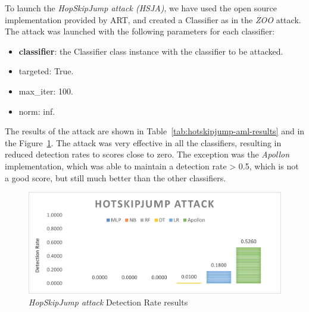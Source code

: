 To launch the \textit{HopSkipJump attack (HSJA)}, we have used the open source implementation provided by ART, and created a Classifier
as in the \textit{ZOO} attack.
The attack was launched with the following parameters for each classifier:

\begin{itemize}
    \item \textbf{classifier}: the Classifier class instance with the classifier to be attacked.
    \item targeted: True.
    \item max\_iter: 100.
    \item norm: inf.
\end{itemize}


The results of the attack are shown in Table~\ref{tab:hotskipjump-aml-results} and in the Figure~\ref{fig:hopskipjump-aml-results}.
The attack was very effective in all the classifiers, resulting in reduced detection rates to scores close to zero.
The exception was the \textit{Apollon} implementation, which was able to maintain a detection rate > 0.5, which is not a good score,
but still much better than the other classifiers.

\begin{table}
    \centering
    \caption{Results of the \textit{HopSkipJump} AML attack}
    \label{tab:hotskipjump-aml-results}
\end{table}

\begin{figure}
    \centering
    \includegraphics[width=0.9\columnwidth]{HSJA.png}
    \caption{\textit{HopSkipJump attack} Detection Rate results}
    \label{fig:hopskipjump-aml-results}
\end{figure}



